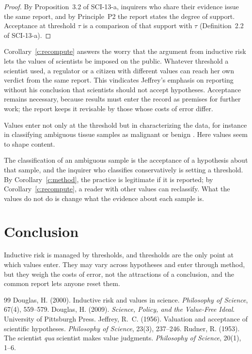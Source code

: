 \documentclass{situationist-preprint}
\begin{document}
\begin{proof}
By Proposition~3.2 of SCI-13-a, inquirers who share their evidence issue the same report, and by Principle~P2 the report states the degree of support. Acceptance at threshold $\tau$ is a comparison of that support with $\tau$ (Definition~2.2 of SCI-13-a).
\end{proof}

Corollary~\ref{c:recompute} answers the worry that the argument from inductive risk lets the values of scientists be imposed on the public. Whatever threshold a scientist used, a regulator or a citizen with different values can reach her own verdict from the same report. This vindicates Jeffrey's emphasis on reporting without his conclusion that scientists should not accept hypotheses. Acceptance remains necessary, because results must enter the record as premises for further work; the report keeps it revisable by those whose costs of error differ.

\begin{objection}
Values enter not only at the threshold but in characterizing the data, for instance in classifying ambiguous tissue samples as malignant or benign \citep{Douglas2000}. Here values seem to shape content.
\end{objection}

\begin{reply}
The classification of an ambiguous sample is the acceptance of a hypothesis about that sample, and the inquirer who classifies conservatively is setting a threshold. By Corollary~\ref{c:method}, the practice is legitimate if it is reported; by Corollary~\ref{c:recompute}, a reader with other values can reclassify. What the values do not do is change what the evidence about each sample is.
\end{reply}

\section{Conclusion}

Inductive risk is managed by thresholds, and thresholds are the only point at which values enter. They may vary across hypotheses and enter through method, but they weigh the costs of error, not the attractions of a conclusion, and the common report lets anyone reset them.

\begin{thebibliography}{99}\small
{} Douglas, H. (2000). Inductive risk and values in science. \emph{Philosophy of Science}, 67(4), 559--579.
 Douglas, H. (2009). \emph{Science, Policy, and the Value-Free Ideal}. University of Pittsburgh Press.
 Jeffrey, R.~C. (1956). Valuation and acceptance of scientific hypotheses. \emph{Philosophy of Science}, 23(3), 237--246.
 Rudner, R. (1953). The scientist \emph{qua} scientist makes value judgments. \emph{Philosophy of Science}, 20(1), 1--6.
\end{thebibliography}
\end{document}
